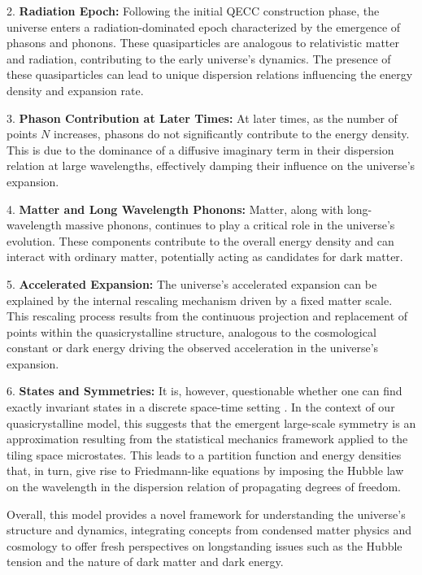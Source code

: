 \documentclass{article}
\begin{document}
2. \textbf{Radiation Epoch:} Following the initial QECC construction phase, the universe enters a radiation-dominated epoch characterized by the emergence of phasons and phonons. These quasiparticles are analogous to relativistic matter and radiation, contributing to the early universe's dynamics. The presence of these quasiparticles can lead to unique dispersion relations influencing the energy density and expansion rate.

3. \textbf{Phason Contribution at Later Times:} At later times, as the number of points $N$ increases, phasons do not significantly contribute to the energy density. This is due to the dominance of a diffusive imaginary term in their dispersion relation at large wavelengths, effectively damping their influence on the universe's expansion.

4. \textbf{Matter and Long Wavelength Phonons:} Matter, along with long-wavelength massive phonons, continues to play a critical role in the universe's evolution. These components contribute to the overall energy density and can interact with ordinary matter, potentially acting as candidates for dark matter.

5. \textbf{Accelerated Expansion:} The universe's accelerated expansion can be explained by the internal rescaling mechanism driven by a fixed matter scale. This rescaling process results from the continuous projection and replacement of points within the quasicrystalline structure, analogous to the cosmological constant or dark energy driving the observed acceleration in the universe's expansion.

6. \textbf{States and Symmetries:} It is, however, questionable whether one can find exactly invariant states in a discrete space-time setting \cite{bojowald}. In the context of our quasicrystalline model, this suggests that the emergent large-scale symmetry is an approximation resulting from the statistical mechanics framework applied to the tiling space microstates. This leads to a partition function and energy densities that, in turn, give rise to Friedmann-like equations by imposing the Hubble law on the wavelength in the dispersion relation of propagating degrees of freedom.

Overall, this model provides a novel framework for understanding the universe's structure and dynamics, integrating concepts from condensed matter physics and cosmology to offer fresh perspectives on longstanding issues such as the Hubble tension and the nature of dark matter and dark energy.
\end{document}
